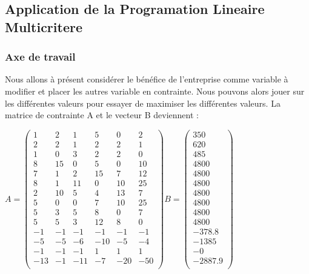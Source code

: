 \documentclass[a4paper, 11pt]{article}
\begin{document}
\subsection{Application de la Programation Lineaire Multicritere}
\subsubsection{Axe de travail}

Nous allons à présent considérer le bénéfice de l’entreprise comme variable à modifier et placer les autres variable en contrainte. Nous pouvons alors jouer sur les différentes valeurs pour essayer de maximiser les différentes valeurs.
La matrice de contrainte A et le vecteur B deviennent : 

$ A = \begin{pmatrix}
1 &2 &1 &5 &0 &2\\
2 &2 &1 &2 &2 &1\\
1 &0 &3 &2 &2 &0\\
8 &15 &0 &5 &0 &10\\
7 &1 &2 &15 &7 &12\\
8 &1 &11 &0 &10 &25\\
2 &10 &5 &4 &13 &7\\
5 &0 &0 &7 &10 &25\\
5 &3 &5 &8 &0 &7\\
5 &5 &3 &12 &8 &0\\
-1 &-1 &-1 &-1 &-1 &-1\\      %
-5 &-5 &-6 &-10 &-5 &-4\\     %
-1 &-1 &-1 &1 &1 &1\\         %
-13 &-1 &-11 &-7 &-20 &-50\\  %
 \end{pmatrix}  B = \begin{pmatrix}
350\\
620\\
485\\
4800\\
4800\\
4800\\
4800\\
4800\\
4800\\
4800\\
-378.8\\
-1385\\
-0\\
-2887.9 \\
 \end{pmatrix} $\\
 
\end{document}
